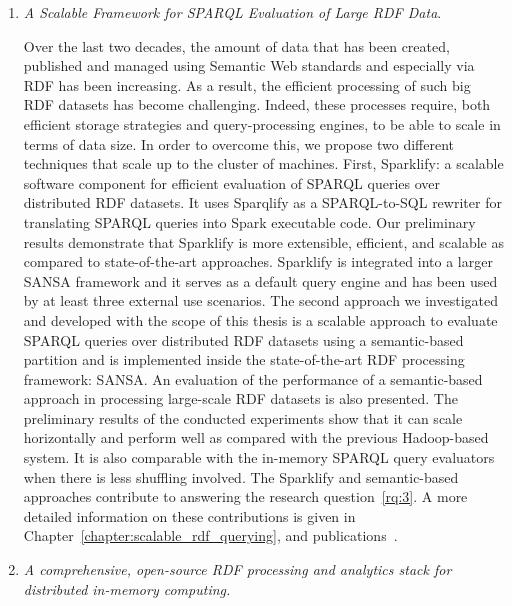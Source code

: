 \begin{enumerate}
    \item \textit{A Scalable Framework for \gls{SPARQL} Evaluation of Large \gls{RDF} Data}.
    
    Over the last two decades, the amount of data that has been created, published and managed using Semantic Web standards and especially via \gls{RDF} has been increasing.
    As a result, the efficient processing of such big \gls{RDF} datasets has become challenging.
    Indeed, these processes require, both efficient storage strategies and query-processing engines, to be able to scale in terms of data size.
    In order to overcome this, we propose two different techniques that scale up to the cluster of machines.
    First, Sparklify: a scalable software component for efficient evaluation of \gls{SPARQL} queries over distributed \gls{RDF} datasets. It uses Sparqlify as a SPARQL-to-SQL rewriter for translating \gls{SPARQL} queries into Spark executable code.
    Our preliminary results demonstrate that Sparklify is more extensible, efficient, and scalable as compared to state-of-the-art approaches.
    Sparklify is integrated into a larger SANSA framework and it serves as a default query engine and has been used by at least three external use scenarios.
    The second approach we investigated and developed with the scope of this thesis is a scalable approach to evaluate \gls{SPARQL} queries over distributed \gls{RDF} datasets using a semantic-based partition and is implemented inside the state-of-the-art \gls{RDF} processing framework: SANSA.
    An evaluation of the performance of a semantic-based approach in processing large-scale \gls{RDF} datasets is also presented. 
    The preliminary results of the conducted experiments show that it can scale horizontally and perform well as compared with the previous Hadoop-based system.
    It is also comparable with the in-memory \gls{SPARQL} query evaluators when there is less shuffling involved.
    The Sparklify and semantic-based approaches contribute to answering the research question~\ref{rq:3}.
    A more detailed information on these contributions is given in Chapter~\ref{chapter:scalable_rdf_querying}, and publications~\cite{2019-sansa-sparklify-iswc, sejdiu-2019-sansa-semantic-based-semantics, sansa-sparklify-ISWC-demo}.
    
    \item \textit{A comprehensive, open-source \gls{RDF} processing and analytics stack for distributed in-memory computing.} 
    

\end{enumerate}
